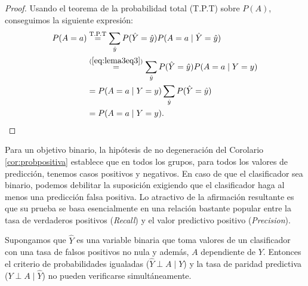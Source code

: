 \documentclass[oneside,openright,titlepage,numbers=noenddot,openany,headinclude,footinclude=true,
cleardoublepage=empty,abstractoff,BCOR=5mm,paper=a4,fontsize=12pt,main=spanish]{scrreprt}
\begin{document}
\begin{proof}
Usando el teorema de la probabilidad total (T.P.T) sobre $P(A)$, conseguimos la siguiente expresión:
\begin{equation*}
\begin{split}
P(A=a)&\overset{\text{T.P.T}}{=}\sum_{\hat{y}}P(\hat{Y}=\hat{y})P(A=a \mid \hat{Y}=\hat{y})\\
&\overset{(\ref{eq:lema3eq3})}{=}\sum_{\hat{y}}P(\hat{Y}=\hat{y})P(A=a \mid Y=y)\\
&=P(A=a \mid Y=y)\sum_{\hat{y}}P(\hat{Y}=\hat{y})\\
&=P(A=a \mid Y=y).
\end{split}
\end{equation*}
\end{proof}

Para un objetivo binario, la hipótesis de no degeneración del Corolario  \ref{cor:probpositiva} establece que en todos los grupos, para todos los valores de predicción, tenemos casos positivos y negativos. En caso de que el clasificador sea binario, podemos debilitar la suposición exigiendo que el clasificador haga al menos una predicción falsa positiva. Lo atractivo de la afirmación resultante es que su prueba se basa esencialmente en una relación bastante popular entre la tasa de verdaderos positivos (\textit{Recall}) y el valor predictivo positivo (\textit{Precision}).\\

\begin{lemma}
Supongamos que $\hat{Y}$ es una variable binaria que toma valores de un clasificador con una tasa de falsos positivos no nula y además, $A$ dependiente de $Y$. Entonces el criterio de probabilidades igualadas ($\hat{Y}\perp A \mid Y$) y la tasa de paridad predictiva ($Y\perp A \mid \hat{Y}$) no pueden verificarse simultáneamente.
\label{lem:preigual}
\end{lemma}
\end{document}
